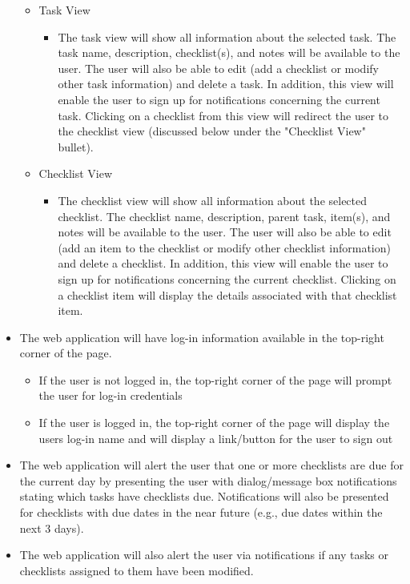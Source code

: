 \documentclass{article}
\begin{document}
\begin{itemize}
\begin{itemize}
		\item Task View
		\begin{itemize}
			\item The task view will show all information about the selected task. The task name, description, checklist(s), and notes will be available to the
					user. The user will also be able to edit (add a checklist or modify other task information) and delete a task. In addition, this view will enable the
					user to sign up for notifications concerning the current task. Clicking on a checklist from this view will redirect the user to the checklist view (discussed below 
					under the "Checklist View" bullet).
		\end{itemize}
		
		\item Checklist View
		\begin{itemize}
			\item The checklist view will show all information about the selected checklist. The checklist name, description, parent task, item(s), and notes will be available to the
					user. The user will also be able to edit (add an item to the checklist or modify other checklist information) and delete a checklist. In addition, this view will enable the
					user to sign up for notifications concerning the current checklist. Clicking on a checklist item will display the details associated with that checklist item.
		\end{itemize}
		
	\end{itemize}
    

	\item The web application will have log-in information available in the top-right corner of the page.
		\begin{itemize}
			\item If the user is not logged in, the top-right corner of the page will prompt the user for log-in credentials
			\item If the user is logged in, the top-right corner of the page will display the users log-in name and will display a link/button for the user to sign out
		\end{itemize}
	\item The web application will alert the user that one or more checklists are due for the current day by presenting the user with dialog/message box notifications stating which tasks have checklists due. Notifications
			will also be presented for checklists with due dates in the near future (e.g., due dates within the next 3 days).
	\item The web application will also alert the user via notifications if any tasks or checklists assigned to them have been modified.
\end{itemize}
\end{document}
